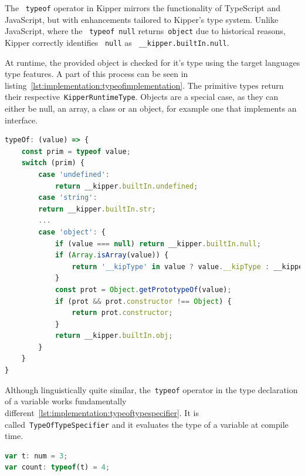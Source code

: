 The ~\lstinline|typeof| operator in Kipper mirrors the functionality of TypeScript and JavaScript, but with enhancements tailored to Kipper's type system. Unlike JavaScript, where the ~\lstinline|typeof null| returns~\lstinline|object| due to historical reasons, Kipper correctly identifies ~\lstinline|null| as ~\lstinline|__kipper.builtIn.null|.

At runtime, the provided object is checked for it's type using the target languages type features. A part of this process can be seen in listing~\ref{lst:implementation:typeofimplementation}. The primitive types return their respective~\lstinline|KipperRuntimeType|. Objects are a special case, as they can either be null, an array, a class or an object, for example one that implements an interface.

\begin{lstlisting}[language=Typescript,caption=Logical implementation of the typeof operator in TypeScript, label=lst:implementation:typeofimplementation]
typeOf: (value) => {
    const prim = typeof value;
    switch (prim) {
        case 'undefined':
            return __kipper.builtIn.undefined;
        case 'string':
        return __kipper.builtIn.str;
        ...
        case 'object': {
            if (value === null) return __kipper.builtIn.null;
            if (Array.isArray(value)) {
                return '__kipType' in value ? value.__kipType : __kipper.builtIn.Array;
            }
            const prot = Object.getPrototypeOf(value);
            if (prot && prot.constructor !== Object) {
                return prot.constructor;
            }
            return __kipper.builtIn.obj;
        }
    }
}
\end{lstlisting}

Although linguistically quite similar, the~\lstinline|typeof| operator in the type declaration of a variable works fundamentally different~\ref{lst:implementation:typeoftypespecifier}. It is called~\lstinline|TypeOfTypeSpecifier| and it evaluates the type of a variable at compile time.

\begin{lstlisting}[language=Typescript,caption=Specifying the type based on a reference variable, label=lst:implementation:typeoftypespecifier]
var t: num = 3;
var count: typeof(t) = 4;
\end{lstlisting}


